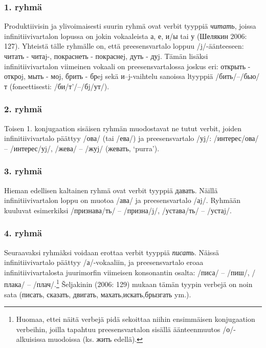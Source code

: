 \documentclass[]{scrartcl}
\begin{document}
\subsubsection{1. ryhmä}\label{ryhmuxe4}

Produktiivisin ja ylivoimaisesti suurin ryhmä ovat verbit tyyppiä
\emph{читать}, joissa infinitiivivartalon lopussa on jokin vokaaleista
а, е, и/ы tai у (Шелякин 2006: 127). Yhteistä tälle ryhmälle on, että
preesensvartalo loppuu /j/-äänteeseen: читать - читаj-, покраснеть -
покраснеj, дуть - дуj. Tämän lisäksi infinitiivivartalon viimeinen
vokaali on preesensvartalossa joskus eri: открыть - откроj, мыть - моj,
брить - брej sekä и--j-vaihtelu sanoissa ltyyppiä /бить/--/бью/т
(foneettisesti: /би/т'/--/бj/ут/).

\subsubsection{2. ryhmä}\label{ryhmuxe4-1}

Toisen 1. konjugaation sisäisen ryhmän muodostavat ne tutut verbit,
joiden infinitiivivartalo päättyy /ова/ (tai /ева/) ja preesensvartalo
/уj/: /интерес/ова/ -- /интерес/уj/, /жева/ -- /жуj/ (жевать, `purra').

\subsubsection{3. ryhmä}\label{ryhmuxe4-2}

Hieman edellisen kaltainen ryhmä ovat verbit tyyppiä давать. Näillä
infinitiivivartalon loppu on muotoa /ава/ ja preesensvartalo /аj/.
Ryhmään kuuluvat esimerkiksi /признава/ть/ -- /призна/j/, /устава/ть/ --
/устаj/.

\subsubsection{4. ryhmä}\label{ryhmuxe4-3}

Seuraavaksi ryhmäksi voidaan erottaa verbit tyyppiä \emph{писать}.
Näissä infinitiivivartalo päättyy /а/-vokaaliin, ja preesensvartalo
eroaa infinitiivivartalosta juurimorfin viimeisen konsonantin osalta:
/писа/ -- /пиш/, /плака/ -- /плач/.\footnote{Huomaa, ettei näitä verbejä
  pidä sekoittaa niihin ensimmäisen konjugaation verbeihin, joilla
  tapahtuu preesensvartalon sisällä äänteenmuutos /о/-alkuisissa
  muodoissa (ks. жить edellä).} Šeljakinin (2006: 129) mukaan tämän
tyypin verbejä on noin sata (писать, сказать, двигать,
махать,искать,брызгать ym.).
\end{document}
